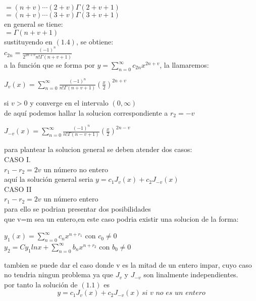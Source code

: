 \documentclass[12pt]{report}
\begin{document}
 \vspace{0.3 cm}
 $=(n+v)\cdots(2+v)\Gamma(2+v+1)$\\
 \vspace{0.3 cm}
 $=(n+v)\cdots(3+v)\Gamma(3+v+1)$\\
 \vspace{0.3 cm}
 en general se tiene:\\
 \vspace{0.3 cm}
 $=\Gamma(n+v+1)$\\
 \vspace{0.3 cm}
 sustituyendo en $(1.4)$, se obtiene:\\
 \vspace{0.3 cm}
$ c_{2n}=\frac{(-1)^{n}}{2^{2n+v}n!\Gamma(n+v+1)}$\\
a la funci\'on que se forma por $y=\sum_{n=0}^{\infty}c_{2n}x^{2n+v}$, la llamaremos:\\
\begin{center}
$J_{v}(x)=\sum_{n=0}^{\infty}\frac{(-1)^{n}}{n!\Gamma(n+v+1)}(\frac{x}{2})^{2n+v}$
\end{center}
 si $v>0$ y converge en el intervalo $(0,\infty)$\\
 de aqu\'i podemos hallar la solucion correspondiente a $r_{2}=-v$\\
\begin{center}
$J_{-v}(x)=\sum_{n=0}^{\infty}\frac{(-1)^{n}}{n!\Gamma(n-v+1)}(\frac{x}{2})^{2n-v}$\\
 
\end{center}
para plantear la solucion general se deben atender dos casos:\\
CASO I.\\
$r_{1}-r_{2}=2v$ un n\'umero no entero\\
aqu\'i la soluci\'on general seria $y=c_{1}J_{v}(x)+c_{2}J_{-v}(x)$\\
CASO II\\
$r_{1}-r_{2}=2v$ un n\'umero entero\\
para ello se podrian presentar dos posibilidades\\
que v=m sea un entero,en este caso podria existir una solucion de la forma:\\
\begin{center}
$y_{1}(x)=\sum_{n=0}^{\infty}c_{n}x^{n+r_{1}}$  con   $c_{0}\neq 0$\\
$y_{2}=Cy_{1}lnx+\sum_{n=0}^{\infty}b_{n}x^{n+r_{2}}$ con $b_{0}\neq 0$
\end{center}
tambien se puede dar el caso donde v es la mitad de un entero impar, cuyo caso no tendria ningun problema ya que $J_{v}$ y $J_{-v}$ son linalmente independientes.\\
por tanto la soluci\'on de $(1.1)$ es\\
\begin{equation}
y=c_{1}J_{v}(x)+c_{2}J_{-v}(x)\,si\,\,v\,\,no\,\,es\,\,un\,\,entero
\end{equation}\\
\end{document}
